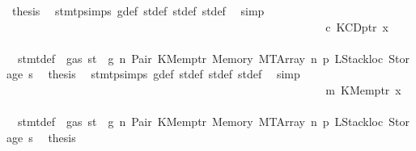 \begin{isabellebody}
\ {\isacharquery}{\kern0pt}thesis\ \isamarkupfalse%
\ stmt{\isachardot}{\kern0pt}psimps{\isacharparenleft}{\kern0pt}{}{\isacharparenright}{\kern0pt}\ g{\isacharunderscore}{\kern0pt}def\ st{\isacharprime}{\kern0pt}{\isacharunderscore}{\kern0pt}def\ st{\isacharprime}{\kern0pt}{\isacharprime}{\kern0pt}{\isacharunderscore}{\kern0pt}def\ st{\isacharprime}{\kern0pt}{\isacharprime}{\kern0pt}{\isacharprime}{\kern0pt}{\isacharunderscore}{\kern0pt}def\ \isamarkupfalse%
\ simp\isanewline
\ \ \ \ \ \ \ \ \ \ \ \ \ \ \ \ \ \ \ \ \ \ \ \ \ \ \isamarkupfalse%
\isanewline
\ \ \ \ \ \ \ \ \ \ \ \ \ \ \ \ \ \ \ \ \ \ \ \ \ \ \ \ \isamarkupfalse%
\ c{}{\isacharcolon}{\kern0pt}\ {\isacharparenleft}{\kern0pt}KCDptr\ x{}{\isacharparenright}{\kern0pt}\isanewline
\ \ \ \ \ \ \ \ \ \ \ \ \ \ \ \ \ \ \ \ \ \ \ \ \ \ \ \ \isamarkupfalse%
\ {}{\isacharparenleft}{\kern0pt}{}{\isacharparenright}{\kern0pt}\ stmt{\isacharunderscore}{\kern0pt}def\ {\isacharbackquoteopen}{\isasymnot}\ gas\ st\ {\isasymle}\ g{\isacharbackquoteclose}\ n\ Pair\ KMemptr\ Memory\ MTArray\ n{}\ p{}\ LStackloc\ Storage\ s{}\ \isamarkupfalse%
\ {\isacharquery}{\kern0pt}thesis\ \isamarkupfalse%
\ stmt{\isachardot}{\kern0pt}psimps{\isacharparenleft}{\kern0pt}{}{\isacharparenright}{\kern0pt}\ g{\isacharunderscore}{\kern0pt}def\ st{\isacharprime}{\kern0pt}{\isacharunderscore}{\kern0pt}def\ st{\isacharprime}{\kern0pt}{\isacharprime}{\kern0pt}{\isacharunderscore}{\kern0pt}def\ st{\isacharprime}{\kern0pt}{\isacharprime}{\kern0pt}{\isacharprime}{\kern0pt}{\isacharunderscore}{\kern0pt}def\ \isamarkupfalse%
\ simp\isanewline
\ \ \ \ \ \ \ \ \ \ \ \ \ \ \ \ \ \ \ \ \ \ \ \ \ \ \isamarkupfalse%
\isanewline
\ \ \ \ \ \ \ \ \ \ \ \ \ \ \ \ \ \ \ \ \ \ \ \ \ \ \ \ \isamarkupfalse%
\ m{}{\isacharcolon}{\kern0pt}\ {\isacharparenleft}{\kern0pt}KMemptr\ x{}{\isacharparenright}{\kern0pt}\isanewline
\ \ \ \ \ \ \ \ \ \ \ \ \ \ \ \ \ \ \ \ \ \ \ \ \ \ \ \ \isamarkupfalse%
\ {}{\isacharparenleft}{\kern0pt}{}{\isacharparenright}{\kern0pt}\ stmt{\isacharunderscore}{\kern0pt}def\ {\isacharbackquoteopen}{\isasymnot}\ gas\ st\ {\isasymle}\ g{\isacharbackquoteclose}\ n\ Pair\ KMemptr\ Memory\ MTArray\ n{}\ p{}\ LStackloc\ Storage\ s{}\ \isamarkupfalse%
\ {\isacharquery}{\kern0pt}thesis\ \isamarkupfalse%

\end{isabellebody}
